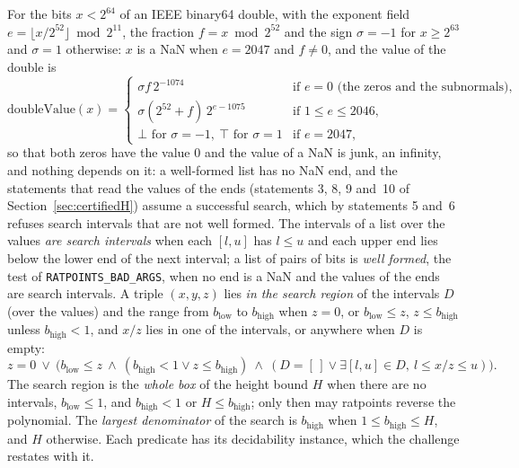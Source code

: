 \begin{definition}\label{def:regionSpec}
  \leanok
  For the bits $x < 2^{64}$ of an IEEE binary64 double, with the exponent field
  $e = \lfloor x / 2^{52} \rfloor \bmod 2^{11}$, the fraction $f = x \bmod 2^{52}$ and the sign
  $\sigma = -1$ for $x \ge 2^{63}$ and $\sigma = 1$ otherwise: $x$ is a NaN when $e = 2047$ and
  $f \ne 0$, and the value of the double is \[ \mathrm{doubleValue}(x) =
    \begin{cases}
      \sigma f\, 2^{-1074} & \text{if } e = 0 \text{ (the zeros and the subnormals)}, \\
      \sigma (2^{52} + f)\, 2^{e - 1075} & \text{if } 1 \le e \le 2046, \\
      \bot \text{ for } \sigma = -1, \ \top \text{ for } \sigma = 1 & \text{if } e = 2047,
    \end{cases}
  \]
  so that both zeros have the value $0$ and the value of a NaN is junk, an infinity, and nothing
  depends on it: a well-formed list has no NaN end, and the statements that read the values of the
  ends (statements 3, 8, 9 and~10 of Section~\ref{sec:certifiedH}) assume a successful search, which
  by statements 5 and~6 refuses search intervals that are not well formed. The intervals of a list
  over the values \emph{are search intervals} when each $[l, u]$ has $l \le u$ and each upper end
  lies below the lower end of the next interval; a list of pairs of bits is \emph{well formed}, the
  test of \verb|RATPOINTS_BAD_ARGS|, when no end is a NaN and the values of the ends are search
  intervals. A triple $(x, y, z)$ lies \emph{in the search region} of the intervals $D$ (over the
  values) and the range from $b_{\mathrm{low}}$ to $b_{\mathrm{high}}$ when $z = 0$, or
  $b_{\mathrm{low}} \le z$, $z \le b_{\mathrm{high}}$ unless $b_{\mathrm{high}} < 1$, and $x/z$ lies
  in one of the intervals, or anywhere when $D$ is empty:
  \[
    z = 0 \ \lor\ \bigl(b_{\mathrm{low}} \le z \ \land\ (b_{\mathrm{high}} < 1 \lor
      z \le b_{\mathrm{high}}) \ \land\ (D = [\,] \lor
      \exists [l, u] \in D,\ l \le x/z \le u)\bigr).
  \]
  The search region is the \emph{whole box} of the height bound $H$ when there are no intervals,
  $b_{\mathrm{low}} \le 1$, and $b_{\mathrm{high}} < 1$ or $H \le b_{\mathrm{high}}$; only then may
  ratpoints reverse the polynomial. The \emph{largest denominator} of the search is
  $b_{\mathrm{high}}$ when $1 \le b_{\mathrm{high}} \le H$, and $H$ otherwise. Each predicate has
  its decidability instance, which the challenge restates with it.
\end{definition}

